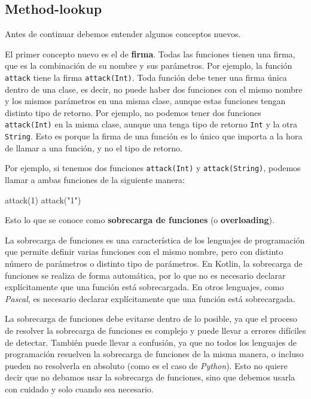 \subsection{Method-lookup}
  \label{sec:method-lookup}
  Antes de continuar debemos entender algunos conceptos nuevos.

  El primer concepto nuevo es el de \textbf{firma}.
  Todas las funciones tienen una firma, que es la combinación de su nombre y sus parámetros.
  Por ejemplo, la función \texttt{attack} tiene la firma \texttt{attack(Int)}.
  Toda función debe tener una firma única dentro de una clase, es decir, no puede haber dos 
  funciones con el mismo nombre y los mismos parámetros en una misma clase, aunque estas funciones 
  tengan distinto tipo de retorno.
  Por ejemplo, no podemos tener dos funciones \texttt{attack(Int)} en la misma clase, aunque una
  tenga tipo de retorno \texttt{Int} y la otra \texttt{String}.
  Esto es porque la firma de una función es lo único que importa a la hora de llamar a una función,
  y no el tipo de retorno.

  Por ejemplo, si tenemos dos funciones \texttt{attack(Int)} y \texttt{attack(String)}, podemos
  llamar a ambas funciones de la siguiente manera:
  
  \begin{kotlin}
    attack(1)
    attack("1")
  \end{kotlin}

  Esto lo que se conoce como \textbf{sobrecarga de funciones} (o 
  \textbf{overloading}).

  \begin{defaultbox}
    La sobrecarga de funciones es una característica de los lenguajes de programación que permite
    definir varias funciones con el mismo nombre, pero con distinto número de parámetros o distinto
    tipo de parámetros.
    En Kotlin, la sobrecarga de funciones se realiza de forma automática, por lo que no es necesario
    declarar explícitamente que una función está sobrecargada.
    En otros lenguajes, como \textit{Pascal}, es necesario declarar explícitamente que una función
    está sobrecargada.
  \end{defaultbox}

  La sobrecarga de funciones debe evitarse dentro de lo posible, ya que el proceso de resolver la
  sobrecarga de funciones es complejo\autocite{OverloadResolutionKotlin} y puede llevar a errores 
  difíciles de detectar.
  También puede llevar a confusión, ya que no todos los lenguajes de programación resuelven la
  sobrecarga de funciones de la misma manera, o incluso pueden no resolverla en absoluto (como es el
  caso de \textit{Python}).
  Esto no quiere decir que no debamos usar la sobrecarga de funciones, sino que debemos usarla con
  cuidado y solo cuando sea necesario.

